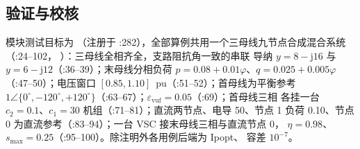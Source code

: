 \subsection{验证与校核}\label{subsec:tp-verify}

模块测试目标为 （注册于
:282），全部算例共用一个三母线九节点合成混合系统
（:24--102，
）：三母线全相齐全，支路阻抗角一致的串联
导纳 $y=8-\mathrm{j}16$ 与 $y=6-\mathrm{j}12$（:36--39）；末母线分相负荷
$p=0.08+0.01\varphi$、$q=0.025+0.005\varphi$（:47--50）；电压窗口
$[0.85,1.10]$~pu（:51--52）；首母线为平衡参考 $1\angle\{0^\circ,-120^\circ,
+120^\circ\}$（:63--67）；$\varepsilon_{\mathrm{vuf}}=0.05$（:69）；首母线三相
各挂一台 $c_2=0.1$、$c_1=30$ 机组（:71--81）；直流两节点、电导 50、节点 1 负荷
0.10、节点 0 为直流参考（:83--94）；一台 VSC 接末母线三相与直流节点 0，
$\eta=0.98$、$s_{\max}=0.25$（:95--100）。除注明外各用例后端为 Ipopt、
容差 $10^{-7}$。


